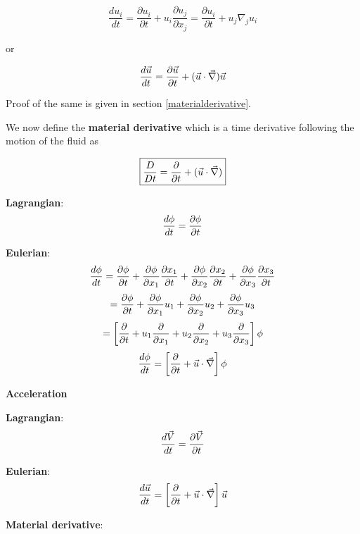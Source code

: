 \begin{equation}
\frac{du_i}{dt} = \frac{\partial u_i}{\partial t} + u_i \frac{\partial u_j}{\partial x_j} = \frac{\partial u_i}{\partial t} + u_j \nabla_j u_i 
\end{equation} 

or

\begin{equation}
\frac{d\vec{u}}{dt} = \frac{\partial \vec{u}}{\partial t} + (\vec{u} \cdot \vec{\nabla}) \vec{u} 
\end{equation} 

Proof of the same is given in section \ref{materialderivative}.

We now define the {\bf material derivative} which is a time derivative following the motion of the fluid as 

\begin{equation}
\boxed{\frac{D}{Dt} = \frac{\partial}{\partial t} + (\vec{u} \cdot \vec{\nabla}) }
\end{equation} 


{\bf Lagrangian}:
$$ {d \phi \over d t} = {\partial \phi \over \partial t} $$

{\bf Eulerian}:
$$ {d \phi \over d t} = {\partial \phi \over \partial t} +  {\partial \phi \over \partial x_1} {\partial x_1 \over \partial t} + {\partial \phi \over \partial x_2} {\partial x_2 \over \partial t} + {\partial \phi \over \partial x_3} {\partial x_3 \over \partial t} $$
$$ = {\partial \phi \over \partial t} +  {\partial \phi \over \partial x_1} u_1 + {\partial \phi \over \partial x_2} u_2 + {\partial \phi \over \partial x_3} u_3 $$
$$ = \left[ {\partial \over \partial t} +  u_1 {\partial \over \partial x_1} + u_2 {\partial \over \partial x_2} + u_3 {\partial \over \partial x_3} \right] \phi $$
$$ {d \phi \over d t} = \left[ {\partial \over \partial t} + \vec{u} \cdot \vec{\nabla} \right] \phi $$


{\bf Acceleration}

{\bf Lagrangian}:
$$ {d \vec{V} \over d t} = {\partial \vec{V} \over \partial t} $$

{\bf Eulerian}:
$$ {d \vec{u} \over d t} = \left[ {\partial \over \partial t} + \vec{u} \cdot \vec{\nabla} \right] \vec{u} $$



{\bf Material derivative}:

